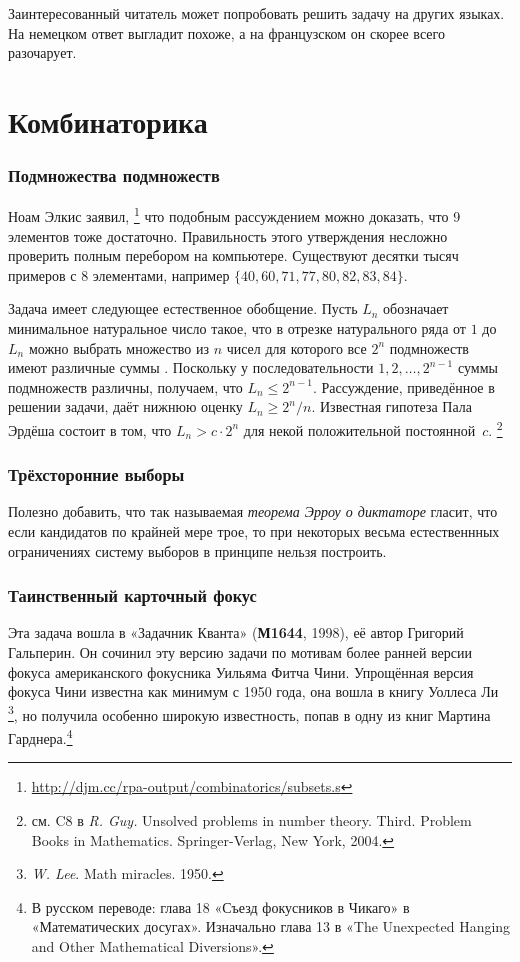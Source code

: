 \documentclass[twoside]{book}
\begin{document}
Заинтересованный читатель может попробовать решить задачу на других языках.
На немецком ответ выгладит похоже, а на французском он скорее всего разочарует.

\section{Комбинаторика}

\subsubsection*{Подмножества подмножеств}
Ноам Элкис заявил,%
\footnote{\url{http://djm.cc/rpa-output/combinatorics/subsets.s}} что подобным рассуждением можно доказать, что 9 элементов тоже достаточно.
Правильность этого утверждения несложно проверить полным перебором на компьютере.
Существуют десятки тысяч примеров с 8 элементами, например $\{40,60,71,77,80,82,83,84\}$. 

Задача имеет следующее естественное обобщение.
Пусть $L_n$ обозначает минимальное натуральное число такое,
что в отрезке натурального ряда от $1$ до $L_n$ можно выбрать множество из $n$ чисел для которого все $2^n$ подмножеств имеют различные суммы \cite[A276661]{oeis}.
Поскольку у последовательности $1,2,\dots, 2^{n-1}$ суммы подмножеств различны, получаем, что $L_n\le 2^{n-1}$.
Рассуждение, приведённое в решении задачи, даёт нижнюю оценку $L_n\ge 2^n/n$.
Известная гипотеза Пала Эрдёша состоит в том, что $L_n>c\cdot 2^n$ для некой положительной постоянной~$c$.%
\footnote{см. C8 в \emph{R. Guy.} Unsolved problems in number theory. Third. Problem Books in Mathematics.
Springer-Verlag, New York, 2004.}


\subsubsection{Трёхсторонние выборы}
Полезно добавить, что так называемая
\textit{теорема Эрроу о диктаторе} гласит, что если кандидатов по крайней мере трое, то при некоторых
весьма естественнных ограничениях систему выборов в принципе нельзя построить.

\subsubsection{Таинственный карточный фокус}
Эта задача вошла в «Задачник Кванта» (\textbf{М1644}, 1998), её автор Григорий Гальперин.
Он сочинил эту версию задачи по мотивам более ранней версии фокуса американского фокусника Уильяма Фитча Чини.
Упрощённая версия фокуса Чини известна как минимум с 1950 года,
она вошла в книгу Уоллеса Ли
%
\footnote{\emph{W. Lee}. Math miracles. 1950.},
но получила особенно широкую известность, попав в одну из книг Мартина Гарднера.\footnote{В русском переводе: глава 18 «Съезд фокусников в Чикаго» в «Математических досугах».
Изначально глава 13 в «The Unexpected Hanging and Other Mathematical Diversions». }
\end{document}
